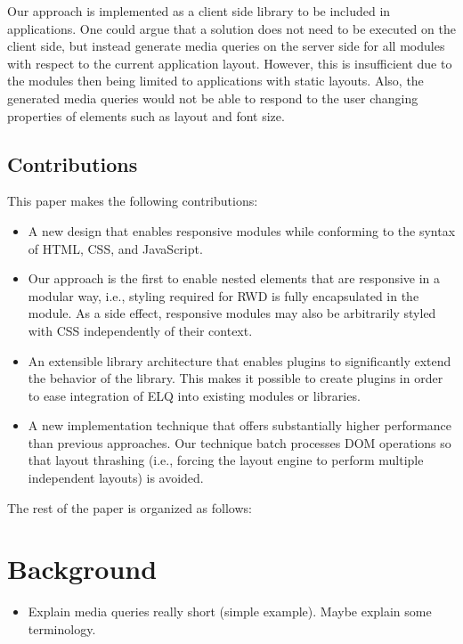 \documentclass{acm_proc_article-sp}
\newcommand{\elq}{ELQ}
\begin{document}
      Our approach is implemented as a client side library to be included in applications.
      One could argue that a solution does not need to be executed on the client side, but instead generate media queries on the server side for all modules with respect to the current application layout.
      However, this is insufficient due to the modules then being limited to applications with static layouts.
      Also, the generated media queries would not be able to respond to the user changing properties of elements such as layout and font size.

    \subsection{Contributions}
      This paper makes the following contributions:
      \begin{itemize}
        \item A new design that enables responsive modules while conforming to the syntax of HTML, CSS, and JavaScript.
        \item
          Our approach is the first to enable nested elements that are responsive in a modular way, i.e., styling required for RWD is fully encapsulated in the module.
          As a side effect, responsive modules may also be arbitrarily styled with CSS independently of their context.
        \item
          An extensible library architecture that enables plugins to significantly extend the behavior of the library.
          This makes it possible to create plugins in order to ease integration of \elq{} into existing modules or libraries.
        \item
          A new implementation technique that offers substantially higher performance than previous approaches.
          Our technique batch processes DOM operations so that layout thrashing (i.e., forcing the layout engine to perform multiple independent layouts) is avoided.
      \end{itemize}

    The rest of the paper is organized as follows:


\section{Background}
  \begin{itemize}
    \item Explain media queries really short (simple example). Maybe explain some terminology.
  \end{itemize}
\end{document}
